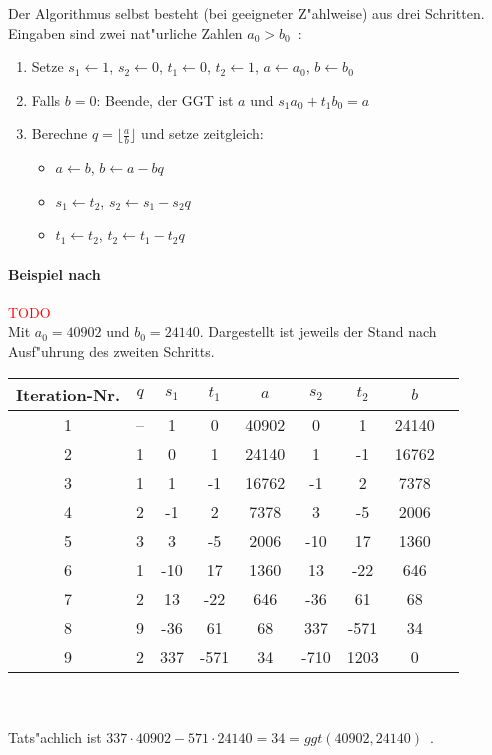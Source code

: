 \documentclass[12pt]{article}
\newcommand{\todo}[1]{\textcolor{red}{\mbox{TODO}}\marginpar{\textcolor{red}{#1}}}
\newcommand{\floor}[1]{\lfloor #1 \rfloor}
\begin{document}
Der Algorithmus selbst besteht (bei geeigneter Z"ahlweise) aus drei Schritten.
Eingaben sind zwei nat"urliche Zahlen $a_0 > b_0$~\cite{taocp2}:
\begin{enumerate}
    \item Setze $s_1 \gets 1$, $s_2 \gets 0$, $t_1 \gets 0$, $t_2 \gets 1$, $a \gets a_0$, $b \gets b_0$
    \item Falls $b = 0$: Beende, der GGT ist $a$ und $s_1 a_0 + t_1 b_0 = a$
    \item Berechne $q = \floor{\frac{a}{b}}$ und setze zeitgleich:
    \begin{itemize}
        \item $a \gets b$, $b \gets a - bq$
        \item $s_1 \gets t_2$, $s_2 \gets s_1 - s_2 q$
        \item $t_1 \gets t_2$, $t_2 \gets t_1 - t_2 q$
    \end{itemize}
\end{enumerate}\cite{taocp2}

\paragraph{Beispiel nach~\cite{taocp2}}\todo{Lieber eigenes Beispiel?}
~\\
Mit $a_0 = 40902$ und $b_0 = 24140$.
Dargestellt ist jeweils der Stand nach Ausf"uhrung des zweiten Schritts.

\begin{tabular}{c|c c c c c c c l}
    Iteration-Nr. & $q$ & $s_1$ & $t_1$ & $a$ & $s_2$ & $t_2$ & $b$ \\
    \hline
    1 & -- & 1 & 0 & 40902 & 0 & 1 & 24140 \\
    2 & 1 & 0 & 1 & 24140 & 1 & -1 & 16762 \\
    3 & 1 & 1 & -1 & 16762 & -1 & 2 & 7378 \\
    4 & 2 & -1 & 2 & 7378 & 3 & -5 & 2006 \\
    5 & 3 & 3 & -5 & 2006 & -10 & 17 & 1360 \\
    6 & 1 & -10 & 17 & 1360 & 13 & -22 & 646 \\
    7 & 2 & 13 & -22 & 646 & -36 & 61 & 68 \\
    8 & 9 & -36 & 61 & 68 & 337 & -571 & 34 \\
    9 & 2 & 337 & -571 & 34 & -710 & 1203 & 0 \\
\end{tabular}
~\\~\\
\noindent
Tats"achlich ist $337 \cdot 40902 - 571 \cdot 24140 = 34 = ggt(40902, 24140)$~\cite{taocp2}.
\end{document}
